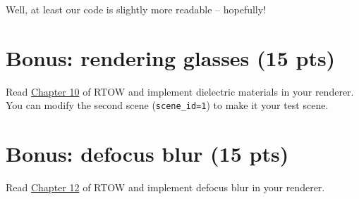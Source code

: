 Well, at least our code is slightly more readable -- hopefully!

\section{Bonus: rendering glasses (15 pts)}
Read \href{https://raytracing.github.io/books/RayTracingInOneWeekend.html#dielectrics}{Chapter 10} of RTOW and implement dielectric materials in your renderer. You can modify the second scene (\lstinline{scene_id=1}) to make it your test scene.

\section{Bonus: defocus blur (15 pts)}
Read \href{https://raytracing.github.io/books/RayTracingInOneWeekend.html#defocusblur}{Chapter 12} of RTOW and implement defocus blur in your renderer.

%
%


